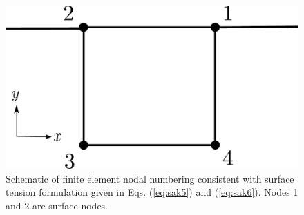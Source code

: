 \documentclass[8.5pt,twoside,twocolumn]{article}
\begin{document}
\begin{figure} \begin{center}
\includegraphics[scale=0.4]{pics/element.pdf}
\caption{Schematic of finite element nodal numbering consistent with surface tension formulation given in Eqs. (\ref{eq:sak5}) and (\ref{eq:sak6}).  Nodes 1 and 2 are surface nodes.}
\label{element} \end{center}
\end{figure}
\end{document}

